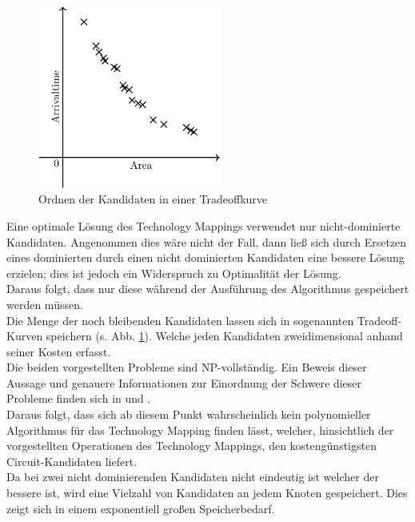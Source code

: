 \documentclass[11pt, a4paper, german]{article}
\newcommand{\TM}{Technology  Mapping }
\begin{document}
 \begin{figure}
		\includegraphics[width = 6cm]{pictures/compiled/tradeoff_kurve}
		\caption{Ordnen der Kandidaten in einer Tradeoffkurve}
		\label{bild:tradeoff_kurve}
\end{figure}
Eine optimale Lösung des Technology Mappings verwendet nur nicht-dominierte Kandidaten.
Angenommen dies wäre nicht der Fall, dann ließ sich durch Ersetzen eines dominierten durch einen nicht dominierten Kandidaten eine bessere Lösung erzielen; dies ist jedoch ein Widerspruch zu Optimalität der Lösung.\\
Daraus folgt, dass nur diese während der Ausführung des Algorithmus gespeichert werden müssen.\\
Die Menge der noch bleibenden Kandidaten lassen sich in sogenannten Tradeoff-Kurven speichern (s. Abb. \ref{bild:tradeoff_kurve}). Welche jeden Kandidaten zweidimensional anhand seiner Kosten erfasst.\\

Die beiden vorgestellten Probleme sind NP-vollständig. Ein Beweis dieser Aussage und genauere Informationen zur Einordnung der Schwere dieser Probleme finden sich in \cite{ComplexitySynthesis} und \citep{Elbert}. \\
Daraus folgt, dass sich ab diesem Punkt wahrscheinlich  kein polynomieller Algorithmus für das \TM finden lässt, welcher, hinsichtlich der vorgestellten Operationen des Technology Mappings, den kostengünstigsten Circuit-Kandidaten liefert.\\
Da bei zwei nicht dominierenden Kandidaten nicht eindeutig ist welcher der bessere ist,  wird eine Vielzahl von Kandidaten an jedem Knoten gespeichert. Dies zeigt sich in einem exponentiell großen Speicherbedarf. \\
\end{document}
